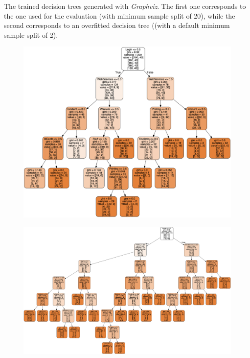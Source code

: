 \documentclass[letterpaper,12pt]{article}
\begin{document}
\begin{appendices}
The trained decision trees generated with \textit{Graphviz}. The first one corresponds to the one used for the evaluation (with minimum sample split of 20), while the second corresponds to an overfitted decision tree ((with a default minimum sample split of 2).

\begin{figure}[h] 
\centerline{\includegraphics[width=\textwidth]{report/figures/decision_tree.png}}
\label{fig:decision_tree}
\end{figure}

\begin{landscape}
\begin{figure}[h] 
\centerline{\includegraphics[width=1.35\textwidth]{report/figures/decision_tree_overfit.png}}
\label{fig:decision_tree_overfit}
\end{figure}
\end{landscape}


\end{appendices}
\end{document}
